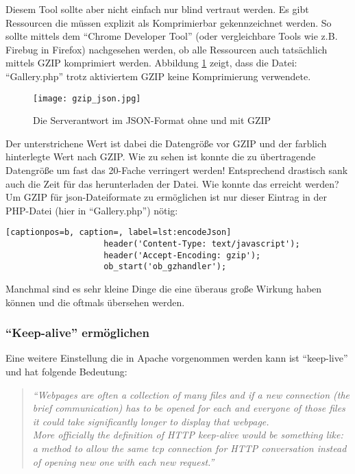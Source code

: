 				Diesem Tool sollte aber nicht einfach nur blind vertraut werden. Es gibt Ressourcen die müssen explizit als Komprimierbar gekennzeichnet werden. So sollte mittels dem "`Chrome Developer Tool"' (oder vergleichbare Tools wie z.B. Firebug in Firefox) nachgesehen werden, ob alle Ressourcen auch tatsächlich mittels GZIP komprimiert werden. Abbildung \ref{fig:gzip_json} zeigt, dass die Datei: "`Gallery.php"' trotz aktiviertem GZIP keine Komprimierung verwendete.

				\begin{figure}[htbp]
					\begin{center}
						\texttt{[image: gzip\_json.jpg]}
						\caption{Die Serverantwort im JSON-Format ohne und mit GZIP}
						\label{fig:gzip_json}
					\end{center}
				\end{figure}

				Der unterstrichene Wert ist dabei die Datengröße vor GZIP und der farblich hinterlegte Wert nach GZIP. Wie zu sehen ist konnte die zu übertragende Datengröße um fast das 20-Fache verringert werden! Entsprechend drastisch sank auch die Zeit für das herunterladen der Datei. Wie konnte das erreicht werden? Um GZIP für json-Dateiformate zu ermöglichen ist nur dieser Eintrag in der PHP-Datei (hier in "`Gallery.php"') nötig:

				\begin{lstlisting}[captionpos=b, caption=, label=lst:encodeJson]
					header('Content-Type: text/javascript');
					header('Accept-Encoding: gzip');
					ob_start('ob_gzhandler');
				\end{lstlisting}

				Manchmal sind es sehr kleine Dinge die eine überaus große Wirkung haben können und die oftmals übersehen werden.
				

			\subsubsection{"`Keep-alive"' ermöglichen} %
			\label{ssub:keep_alive_ermöglichen}
				Eine weitere Einstellung die in Apache vorgenommen werden kann ist "`keep-live"' und hat folgende Bedeutung:
				\begin{quote}
					\textit{"`Webpages are often a collection of many files and if a new connection (the brief communication) has to be opened for each and everyone of those files it could take significantly longer to display that webpage.\\
					More officially the definition of HTTP keep-alive would be something like: a method to allow the same tcp connection for HTTP conversation instead of opening new one with each new request."'}\autocite{sextonAlive}
				\end{quote}

